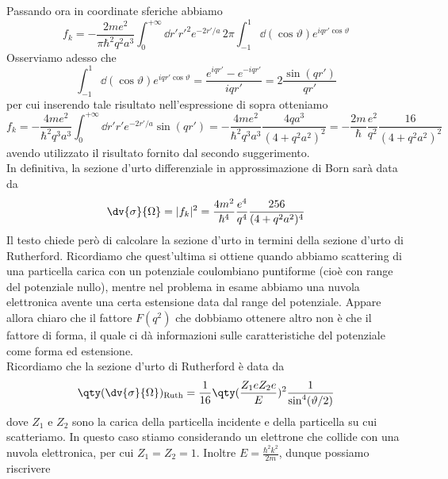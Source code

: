\begin{soluzione}
   Passando ora in coordinate sferiche abbiamo
   \begin{equation*}
      f_k
      =-\frac{2 m e^2}{\pi \hbar^2 q^2 a^3} \int_{0}^{+\infty} \dd{r'} {r'}^2  e^{-2 r'/a} \, 2\pi \int_{-1}^{1} \dd{(\cos{\vartheta})} e^{i q r' \cos{\vartheta}}
   \end{equation*}
   Osserviamo adesso che
   \begin{equation*}
      \int_{-1}^{1} \dd{(\cos{\vartheta})} e^{i q r' \cos{\vartheta}}
      =\frac{e^{i q r'} - e^{-i q r'}}{i q r'}
      =2 \frac{\sin(q r')}{q r'}
   \end{equation*}
   per cui inserendo tale risultato nell'espressione di sopra otteniamo
   \begin{equation*}
      f_k
      =-\frac{4 m e^2}{\hbar^2 q^3 a^3} \int_{0}^{+\infty} \dd{r'} r' e^{-2 r'/a} \sin(q r')
      =-\frac{4 m e^2}{\hbar^2 q^3 a^3} \frac{4 q a^3}{(4 + q^2 a^2)^2}
      =-\frac{2m}{\hbar} \frac{e^2}{q^2} \frac{16}{(4 + q^2 a^2)^2}
   \end{equation*}
   avendo utilizzato il risultato fornito dal secondo suggerimento.\\
   In definitiva, la sezione d'urto differenziale in approssimazione di Born sarà data da
   \begin{equation}
      \dv{\sigma}{\Omega}
      =|f_k|^2
      =\frac{4m^2}{\hbar^4} \frac{e^4}{q^4} \frac{256}{(4 + q^2 a^2)^4}
      \label{eq:sezione_durto_differenziale_nube_elettronica}
   \end{equation}
   Il testo chiede però di calcolare la sezione d'urto in termini della sezione d'urto di Rutherford. Ricordiamo che quest'ultima si ottiene quando abbiamo scattering di una particella carica con un potenziale coulombiano puntiforme (cioè con range del potenziale nullo), mentre nel problema in esame abbiamo una nuvola elettronica avente una certa estensione data dal range del potenziale. Appare allora chiaro che il fattore $F(q^2)$ che dobbiamo ottenere altro non è che il fattore di forma, il quale ci dà informazioni sulle caratteristiche del potenziale come forma ed estensione.\\
   Ricordiamo che la sezione d'urto di Rutherford è data da
   \begin{equation*}
      \qty( \dv{\sigma}{\Omega} )_{\rm Ruth}
      =\frac{1}{16} \qty( \frac{Z_1 e Z_2 e}{E} )^2 \frac{1}{\sin^4(\vartheta/2)}
   \end{equation*}
   dove $Z_1$ e $Z_2$ sono la carica della particella incidente e della particella su cui scatteriamo. In questo caso stiamo considerando un elettrone che collide con una nuvola elettronica, per cui $Z_1=Z_2=1$. Inoltre $E=\frac{\hbar^2 k^2}{2m}$, dunque possiamo riscrivere

\end{soluzione}
